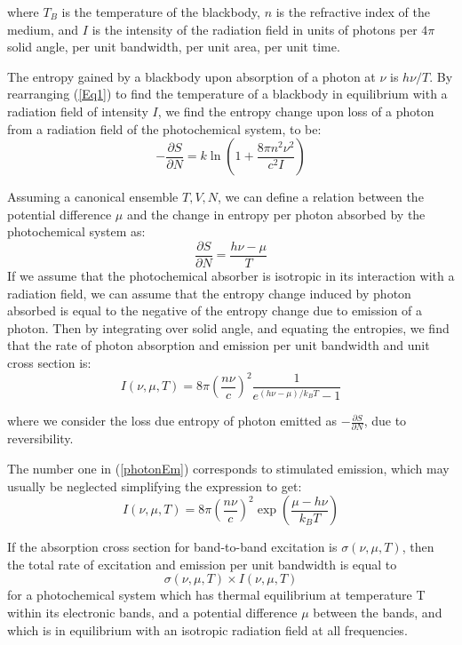 \documentclass[book.tex]{subfiles}
\begin{document}
\noindent where $T_B$ is the temperature of the blackbody, $n$ is the refractive index of the medium, and $I$ is the intensity of the radiation field in units of photons per $4\pi$ solid angle, per unit bandwidth, per unit area, per unit time.

The entropy gained by a blackbody upon absorption of a photon at $\nu$ is $h\nu/T$. By rearranging (\ref{Eq1}) to find the temperature of a blackbody in equilibrium with a radiation field of intensity $I$, we find the entropy change upon loss of a photon from a radiation field of the photochemical system, to be:
\begin{equation}\label{Eq2}
-\frac{\partial S}{\partial N} = k\ln\left( 1+  \frac{8\pi n^2\nu^2}{c^2I}\right)
\end{equation}

Assuming a canonical ensemble $T,V,N$, we can define a relation between the potential difference $\mu$ and the change in entropy per photon absorbed by the photochemical system as:
\begin{equation}\label{Eq3}
 \frac{\partial S}{\partial N} = \frac{h\nu - \mu}{T}
\end{equation}
If we assume that the photochemical absorber is isotropic in its interaction with a radiation field, we can assume that the entropy change induced by photon absorbed is equal to the negative of the entropy change due to emission of a photon. Then by integrating over solid angle, and equating the entropies, we find that the rate of photon absorption and emission per unit bandwidth and unit cross section is:
\begin{equation}\label{photonEm}
I(\nu,\mu,T) = 8\pi\left(\frac{n\nu}{c}\right)^2\frac{1}{e^{(h\nu-\mu)/k_BT}-1}
\end{equation}

\noindent where we consider the loss due entropy of photon emitted as $-\frac{\partial S}{\partial N}$, due to reversibility.

The number one in (\ref{photonEm}) corresponds to stimulated emission, which may usually be neglected simplifying the expression to get:
\begin{equation}\label{Eq4}
I(\nu,\mu,T) = 8\pi\left(\frac{n\nu}{c}\right)^2\exp\left(\frac{\mu-h\nu}{k_BT}\right)
\end{equation}

If the absorption cross section for band-to-band excitation is $\sigma(\nu,\mu,T)$, then the total rate of excitation and emission per unit bandwidth is equal to
\begin{equation}\label{Eq5}
\sigma(\nu,\mu,T) \times I(\nu,\mu,T)
\end{equation}
for a photochemical system which has thermal equilibrium at temperature T within its electronic bands, and a potential difference $\mu$ between the bands, and which is in equilibrium with an isotropic radiation field at all frequencies.
\end{document}
